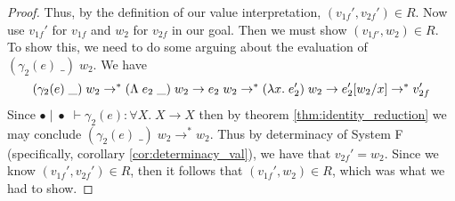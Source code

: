 \documentclass[twoside,11pt,openright]{report}
\theoremstyle{definition}
\newcommand{\var}{x}
\newcommand{\expr}{e}
\newcommand{\val}{v}
\newcommand{\valB}{w}
\newcommand{\Tvar}{X}
\newcommand{\Tlam}{\Lambda\;}
\newcommand{\Tapp}[1]{#1\;\_}
\newcommand{\subst}[3]{#1{\left[#3 \middle/ #2 \right]}}
\newcommand{\Tfunc}[2]{#1 \rightarrow #2}
\newcommand{\Tall}[2]{\forall #1.\; #2}
\newcommand{\emptenv}{\bullet}
\newcommand{\empvenv}{\bullet}
\newcommand{\jdg}[4]{#1 \; | \; #2 \; \vdash #3 : #4}
\newcommand{\step}{\rightarrow}
\newcommand{\stepS}{\rightarrow^*}
\begin{document}
\begin{proof}
  Thus, by the definition of our value interpretation, $(\val_{1f}', \val_{2f}') \in R$. Now use $\val_{1f}'$ for $\val_{1f}$ and $\valB_2$ for $\val_{2f}$ in our goal. Then we must show $(\val_{1f'}, \valB_2) \in R$. To show this, we need to do some arguing about the evaluation of $(\Tapp{\gamma_2(\expr)}) \; \valB_2$. We have 
  \begin{equation*}
    (\Tapp{\gamma_2(\expr)}) \; \valB_2 \stepS (\Tapp{\Tlam \expr_2}) \; \valB_2 \step \expr_2 \; \valB_2 \stepS (\fun \var . \expr_2') \; \valB_2 \step \subst{\expr_2'}{\var}{\valB_2} \stepS \val_{2f}'
  \end{equation*}
  Since $\jdg{\emptenv}{\empvenv}{\gamma_2(\expr)}{\Tall{\Tvar}{\Tfunc{\Tvar}{\Tvar}}}$ then by theorem \ref{thm:identity_reduction} we may conclude $(\Tapp{\gamma_2(\expr)}) \; \valB_2 \stepS \valB_2$. Thus by determinacy of System F (specifically, corollary \ref{cor:determinacy_val}), we have that $\val_{2f}' = \valB_2$. Since we know $(\val_{1f}', \val_{2f}') \in R$, then it follows that $(\val_{1f}', \valB_2) \in R$, which was what we had to show.
\end{proof}
\end{document}
